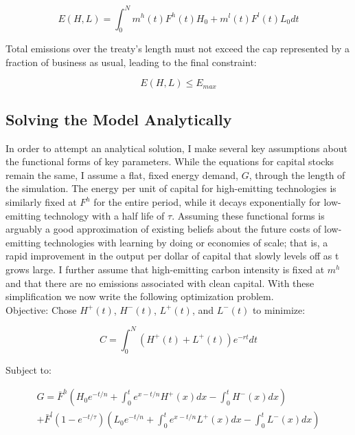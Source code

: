 \documentclass{easychithesis}
\begin{document}
\begin{equation}\label{eq:simpleSimEmission}
E(H, L) = \int_0^N  m^h(t) F^h(t) H_0 + m^l(t) F^l(t) L_0 dt
\end{equation}

Total emissions over the treaty's length must not exceed the cap represented by a fraction of business as usual, leading to the final constraint: 

\begin{equation}\label{eq:simpleEmitConstraint}
E(H,L) \leq E_{max}
\end{equation}



\subsection{Solving the Model Analytically}

In order to attempt an analytical solution, I make several key assumptions about the functional forms of key parameters. While the equations for capital stocks remain the same, I assume a flat, fixed energy demand, $G$, through the length of the simulation. The energy per unit of capital for high-emitting technologies is similarly fixed at $F^h$ for the entire period, while it decays exponentially for low-emitting technology with a half life of $\tau$. Assuming these functional forms is arguably a good approximation of existing beliefs about the future costs of low-emitting technologies with learning by doing or economies of scale; that is, a rapid improvement in the output per dollar of capital that slowly levels off as t grows large. I further assume that high-emitting carbon intensity is fixed at $m^h$ and that there are no emissions associated with clean capital. With these simplification we now write the following optimization problem. \\

Objective: Chose $H^+(t)$, $H^-(t)$, $L^+(t)$, and $L^-(t)$ to minimize:

\begin{equation}\label{eq:analyticalObj}
C = \int_0^N (H^+(t) + L^+(t))e^{-rt} dt
\end{equation}

Subject to: 

\begin{multline}\label{eq:analyticalGen}
G = \bar{F}^h\left (H_0 e^{-t/n} + \int_0^t e^{x-t/n} H^+(x) dx - \int_0^t H^-(x)dx \right) \\ + \bar{F}^l(1-e^{-t/\tau}) \left ( L_0 e^{-t/n} + \int_0^t e^{x-t/n} L^+(x) dx - \int_0^t L^-(x)dx\right )
\end{multline}
\end{document}
